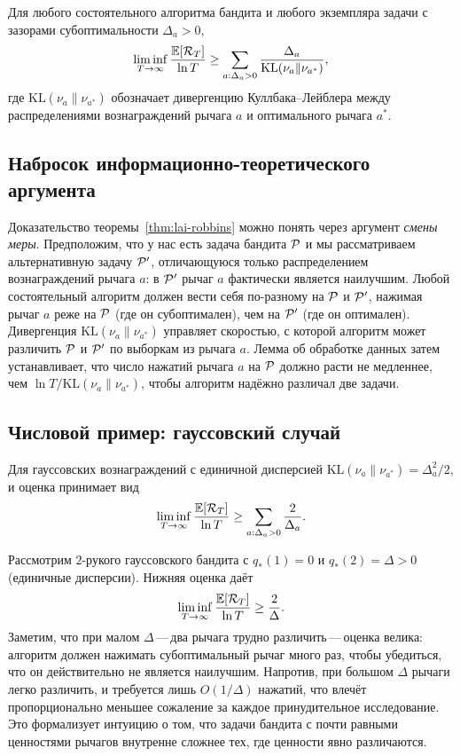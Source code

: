 \begin{theorem}
\label{thm:lai-robbins}
Для любого состоятельного алгоритма бандита и любого экземпляра задачи с зазорами субоптимальности $\Delta_a>0$,
\begin{equation}
\label{eq:lai-robbins}
\liminf_{T\to\infty} \frac{\operatorname{\mathbb{E}}[\mathcal{R}_T]}{\ln T} \ge \sum_{a:\Delta_a>0} \frac{\Delta_a}{\mathrm{KL}(\nu_a\|\nu_{a^*})},
\end{equation}
где $\mathrm{KL}(\nu_a\|\nu_{a^*})$ обозначает дивергенцию Куллбака--Лейблера между распределениями вознаграждений рычага $a$ и оптимального рычага $a^*$.
\end{theorem}

\subsection*{Набросок информационно-теоретического аргумента}

Доказательство теоремы~\ref{thm:lai-robbins} можно понять через аргумент \emph{смены меры}.  Предположим, что у нас есть задача бандита $\mathcal{P}$ и мы рассматриваем альтернативную задачу $\mathcal{P}'$, отличающуюся только распределением вознаграждений рычага $a$: в $\mathcal{P}'$ рычаг $a$ фактически является наилучшим.  Любой состоятельный алгоритм должен вести себя по-разному на $\mathcal{P}$ и $\mathcal{P}'$, нажимая рычаг $a$ реже на $\mathcal{P}$ (где он субоптимален), чем на $\mathcal{P}'$ (где он оптимален).  Дивергенция $\mathrm{KL}(\nu_a\|\nu_{a^*})$ управляет скоростью, с которой алгоритм может различить $\mathcal{P}$ и $\mathcal{P}'$ по выборкам из рычага $a$.  Лемма об обработке данных затем устанавливает, что число нажатий рычага $a$ на $\mathcal{P}$ должно расти не медленнее, чем $\ln T / \mathrm{KL}(\nu_a\|\nu_{a^*})$, чтобы алгоритм надёжно различал две задачи.

\subsection*{Числовой пример: гауссовский случай}

Для гауссовских вознаграждений с единичной дисперсией $\mathrm{KL}(\nu_a\|\nu_{a^*})=\Delta_a^2/2$, и оценка принимает вид
\[
\liminf_{T\to\infty}\frac{\operatorname{\mathbb{E}}[\mathcal{R}_T]}{\ln T}\ge \sum_{a:\Delta_a>0}\frac{2}{\Delta_a}.
\]

\begin{example}
\label{ex:gaussian-lower-bound}
Рассмотрим $2$-рукого гауссовского бандита с $q_*(1)=0$ и $q_*(2)=\Delta>0$ (единичные дисперсии).  Нижняя оценка даёт
\[
\liminf_{T\to\infty}\frac{\operatorname{\mathbb{E}}[\mathcal{R}_T]}{\ln T}\ge \frac{2}{\Delta}.
\]
Заметим, что при малом $\Delta$\,---\,два рычага трудно различить\,---\,оценка велика: алгоритм должен нажимать субоптимальный рычаг много раз, чтобы убедиться, что он действительно не является наилучшим.  Напротив, при большом $\Delta$ рычаги легко различить, и требуется лишь $O(1/\Delta)$ нажатий, что влечёт пропорционально меньшее сожаление за каждое принудительное исследование.  Это формализует интуицию о том, что задачи бандита с почти равными ценностями рычагов внутренне сложнее тех, где ценности явно различаются.
\end{example}

